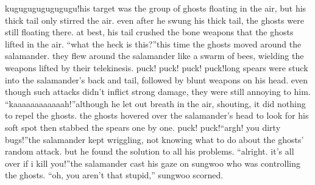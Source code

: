 kugugugugugugugu!his target was the group of ghosts floating in the air, but his thick tail only stirred the air.
even after he swung his thick tail, the ghosts were still floating there.
 at best, his tail crushed the bone weapons that the ghosts lifted in the air.
“what the heck is this?”this time the ghosts moved around the salamander.
 they flew around the salamander like a swarm of bees, wielding the weapons lifted by their telekinesis.
puck! puck! puck! puck!long spears were stuck into the salamander’s back and tail, followed by blunt weapons on his head.
 even though such attacks didn’t inflict strong damage, they were still annoying to him.
“kaaaaaaaaaaaah!”although he let out breath in the air, shouting, it did nothing to repel the ghosts.
the ghosts hovered over the salamander’s head to look for his soft spot then stabbed the spears one by one.
puck! puck!“argh! you dirty bugs!”the salamander kept wriggling, not knowing what to do about the ghosts’ random attack.
 but he found the solution to all his problems.
“alright.
 it’s all over if i kill you!”the salamander cast his gaze on sungwoo who was controlling the ghosts.
“oh, you aren’t that stupid,” sungwoo scorned.

